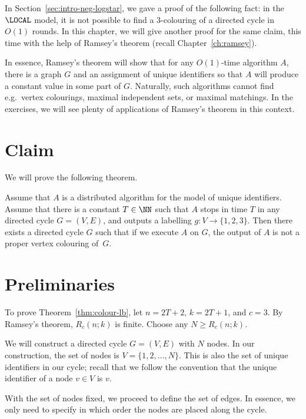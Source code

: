 
In Section~\ref{sec:intro-neg-logstar}, we gave a proof of the following fact: in the $\LOCAL$ model, it is not possible to find a $3$-colouring of a directed cycle in $O(1)$ rounds. In this chapter, we will give another proof for the same claim, this time with the help of Ramsey's theorem (recall Chapter~\ref{ch:ramsey}).

In essence, Ramsey's theorem will show that for any $O(1)$-time algorithm $A$, there is a graph $G$ and an assignment of unique identifiers so that $A$ will produce a constant value in some part of $G$. Naturally, such algorithms cannot find e.g.\ vertex colourings, maximal independent sets, or maximal matchings. In the exercises, we will see plenty of applications of Ramsey's theorem in this context.


\section{Claim}

We will prove the following theorem.

\begin{theorem}\label{thm:colour-lb}
    Assume that $A$ is a distributed algorithm for the model of unique identifiers. Assume that there is a constant $T \in \NN$ such that $A$ stops in time $T$ in any directed cycle $G = (V,E)$, and outputs a labelling $g\colon V \to \{1,2,3\}$. Then there exists a directed cycle $G$ such that if we execute $A$ on $G$, the output of $A$ is not a proper vertex colouring of~$G$.
\end{theorem}


\section{Preliminaries}

To prove Theorem~\ref{thm:colour-lb}, let $n = 2T+2$, $k = 2T+1$, and $c = 3$. By Ramsey's theorem, $R_c(n;k)$ is finite. Choose any $N \ge R_c(n;k)$.

We will construct a directed cycle $G = (V,E)$ with $N$ nodes. In our construction, the set of nodes is $V = \{1,2,\dotsc,N\}$. This is also the set of unique identifiers in our cycle; recall that we follow the convention that the unique identifier of a node $v \in V$ is $v$.

With the set of nodes fixed, we proceed to define the set of edges. In essence, we only need to specify in which order the nodes are placed along the cycle.


